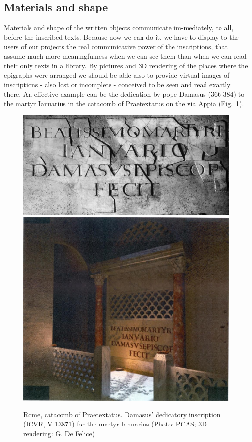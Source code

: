 \documentclass[amsthm,ebook]{saparticle}
\begin{document}
\subsection{Materials and shape }


\noindent Materials and shape of the written objects communicate im-mediately, to all, before the inscribed texts. Because now we
can do it, we have to display to the users of our projects the real communicative power of the inscriptions, that
assume much more meaningfulness when we can see them than when we can read their only texts in a library. By pictures
and 3D rendering of the places where the epigraphs were arranged we should be able also to provide virtual images of
inscriptions {}- also lost or incomplete - conceived to be seen and read exactly there. An effective example can be
the dedication by pope Damasus (366-384) to the martyr Ianuarius in the catacomb of Praetextatus on the via Appia (Fig.~\ref{fig:6}). 

\begin{figure}[!bp]
\centering
 \includegraphics[width=\columnwidth]{FelleVisualFeaturesofinscriptionsEAGLE2016FullPaper-img008.jpg}
 \includegraphics[width=\columnwidth]{FelleVisualFeaturesofinscriptionsEAGLE2016FullPaper-img009.jpg}
\caption{Rome, catacomb of Praetextatus. Damasus’ dedicatory inscription (ICVR, V 13871) for the martyr Ianuarius (Photo:
PCAS; 3D rendering: G. De Felice)}
\label{fig:6}
\end{figure}
\end{document}
